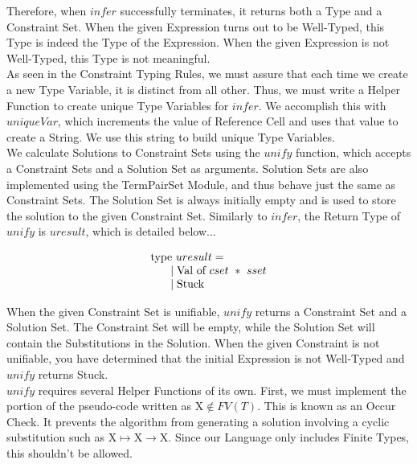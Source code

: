 \documentclass{article}
\begin{document}
Therefore, when $infer$ successfully terminates, it returns both a Type and a Constraint Set. When the given Expression turns out to be Well-Typed, this Type is indeed the Type of the Expression. When the given Expression is not Well-Typed, this Type is not meaningful. \\

As seen in the Constraint Typing Rules, we must assure that each time we create a new Type Variable, it is distinct from all other. Thus, we must write a Helper Function to create unique Type Variables for $infer$. We accomplish this with $uniqueVar$, which increments the value of Reference Cell and uses that value to create a String. We use this string to build unique Type Variables. \\

We calculate Solutions to Constraint Sets using the $unify$ function, which accepts a Constraint Sets and a Solution Set as arguments. Solution Sets are also implemented using the TermPairSet Module, and thus behave just the same as Constraint Sets. The Solution Set is always initially empty and is used to store the solution to the given Constraint Set. Similarly to $infer$, the Return Type of $unify$ is $uresult$, which is detailed below...

\begin{equation}
    \begin{array}{l}
    \text{type} \ uresult = \\
    \indent \mid \text{Val of} \ cset \ * \ sset \\
    \indent \mid \text{Stuck}
    \end{array}
\end{equation}

When the given Constraint Set is unifiable, $unify$ returns a Constraint Set and a Solution Set. The Constraint Set will be empty, while the Solution Set will contain the Substitutions in the Solution. When the given Constraint is not unifiable, you have determined that the initial Expression is not Well-Typed and $unify$ returns Stuck. \\

$unify$ requires several Helper Functions of its own. First, we must implement the portion of the pseudo-code written as $\text{X} \notin FV(T)$. This is known as an Occur Check. It prevents the algorithm from generating a solution involving a cyclic substitution such as $\text{X} \mapsto \text{X} \to \text{X}$. Since our Language only includes Finite Types, this shouldn't be allowed. \\
\end{document}
